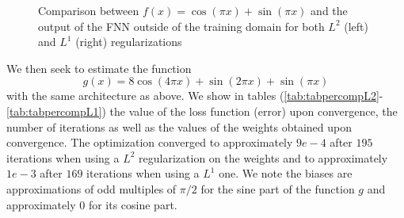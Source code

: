 \documentclass[AMS,STIX1COL]{WileyNJD-v2}
\begin{document}
 
   \begin{figure}[!htb]
    \centering
    \caption{\;Comparison between $f(x) = \cos(\pi x) + \sin(\pi x)$ and the output of the FNN  outside of the training domain for both $L^2$ (left) and $L^1$ (right) regularizations}
    \label{fig:fourvsNN_outside}
\end{figure}


We then seek to estimate the function 
$$g(x) = 8 \cos(4\pi x) + \sin(2\pi x) + \sin(\pi x)$$ with the same architecture as above. We show in tables (\ref{tab:tabpercompL2}-\ref{tab:tabpercompL1}) the value of the loss function (error) upon convergence, the number of iterations as well as the values of the weights obtained upon convergence. The optimization converged to approximately $9e-4$ after $195$ iterations when using a $L^2$ regularization on the weights and to approximately $1e-3$ after $169$ iterations when using a $L^1$ one.  We note the biases are approximations of odd multiples of $\pi/2$ for the sine part of the function $g$ and approximately $0$ for its cosine part. 
\end{document}
